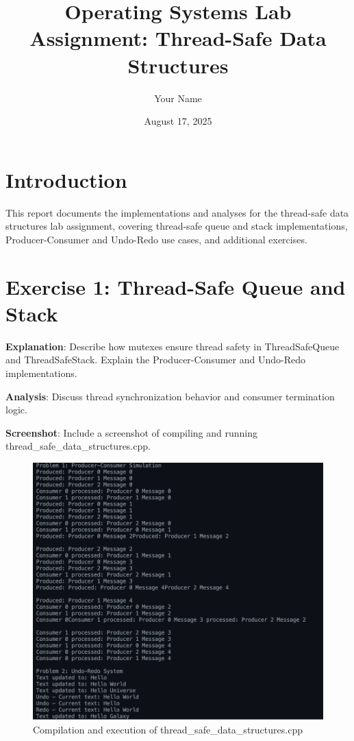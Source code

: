 \documentclass[a4paper,11pt]{article}
\begin{document}
\title{Operating Systems Lab Assignment: Thread-Safe Data Structures}
\author{Your Name}
\date{August 17, 2025}
\maketitle

\section{Introduction}
This report documents the implementations and analyses for the thread-safe data structures lab assignment, covering thread-safe queue and stack implementations, Producer-Consumer and Undo-Redo use cases, and additional exercises.

\section{Exercise 1: Thread-Safe Queue and Stack}

\textbf{Explanation}: Describe how mutexes ensure thread safety in ThreadSafeQueue and ThreadSafeStack. Explain the Producer-Consumer and Undo-Redo implementations.

\textbf{Analysis}: Discuss thread synchronization behavior and consumer termination logic.

\textbf{Screenshot}: Include a screenshot of compiling and running thread_safe_data_structures.cpp.
\begin{figure}[H]
    \centering
    \includegraphics[width=\textwidth]{ThreadSafe.png}
    \caption{Compilation and execution of thread_safe_data_structures.cpp}
\end{figure}
\end{document}
